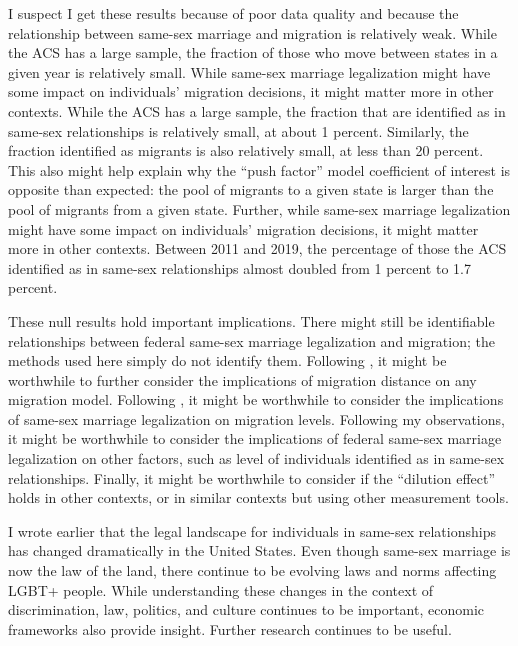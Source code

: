 \documentclass[12pt,letterpaper]{article}
\begin{document}
I suspect I get these results because of poor data quality and because the relationship between same-sex marriage and migration is relatively weak. While the ACS has a large sample, the fraction of those who move between states in a given year is relatively small. While same-sex marriage legalization might have some impact on individuals’ migration decisions, it might matter more in other contexts. While the ACS has a large sample, the fraction that are identified as in same-sex relationships is relatively small, at about 1 percent. Similarly, the fraction identified as migrants is also relatively small, at less than 20 percent. This also might help explain why the “push factor” model coefficient of interest is opposite than expected: the pool of migrants to a given state is larger than the pool of migrants from a given state. Further, while same-sex marriage legalization might have some impact on individuals’ migration decisions, it might matter more in other contexts. Between 2011 and 2019, the percentage of those the ACS identified as in same-sex relationships almost doubled from 1 percent to 1.7 percent.

These null results hold important implications. There might still be identifiable relationships between federal same-sex marriage legalization and migration; the methods used here simply do not identify them. Following \citet{1, 12}, it might be worthwhile to further consider the implications of migration distance on any migration model. Following \citet{15}, it might be worthwhile to consider the implications of same-sex marriage legalization on migration levels. Following my observations, it might be worthwhile to consider the implications of federal same-sex marriage legalization on other factors, such as level of individuals identified as in same-sex relationships. Finally, it might be worthwhile to consider if the “dilution effect” holds in other contexts, or in similar contexts but using other measurement tools.

I wrote earlier that the legal landscape for individuals in same-sex relationships has changed dramatically in the United States. Even though same-sex marriage is now the law of the land, there continue to be evolving laws and norms affecting LGBT+ people. While understanding these changes in the context of discrimination, law, politics, and culture continues to be important, economic frameworks also provide insight. Further research continues to be useful.

\newpage


\end{document}
